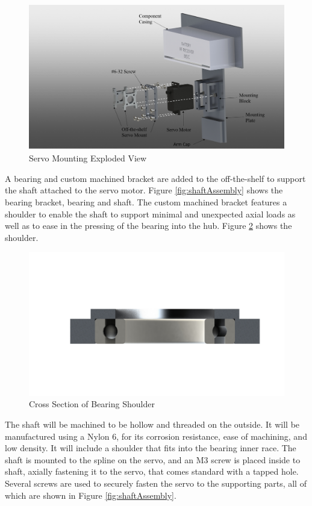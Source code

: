 \documentclass[../main.tex]{subfiles}
\begin{document}
  \begin{figure}[H]
 	\centering
 	\includegraphics[width=.8\linewidth]{img/design/thruster/servoAssembly.png}
 	\caption{Servo Mounting Exploded View}
 	\label{fig:servoAssembly}
 \end{figure}
 
 A bearing and custom machined bracket are added to the off-the-shelf to support the shaft attached to the servo motor. Figure \ref{fig:shaftAssembly} shows the bearing bracket, bearing and shaft. The custom machined bracket features a shoulder to enable the shaft to support minimal and unexpected axial loads as well as to ease in the pressing of the bearing into the hub. Figure \ref{fig:bearingShoulder} shows the shoulder. 
 
   \begin{figure}[H]
 	\centering
 	\includegraphics[width=.4\linewidth]{img/design/thruster/bearingLip.JPG}
 	\caption{Cross Section of Bearing Shoulder}
 	\label{fig:bearingShoulder}
 \end{figure}
 
 The shaft will be machined to be hollow and threaded on the outside. It will be manufactured using a Nylon 6, for its corrosion resistance, ease of machining, and low density. It will include a shoulder that fits into the bearing inner race. The shaft is mounted to the spline on the servo, and an M3 screw is placed inside to shaft, axially fastening it to the servo, that comes standard with a tapped hole. Several screws are used to securely fasten the servo to the supporting parts, all of which are shown in Figure \ref{fig:shaftAssembly}.
 
\end{document}
